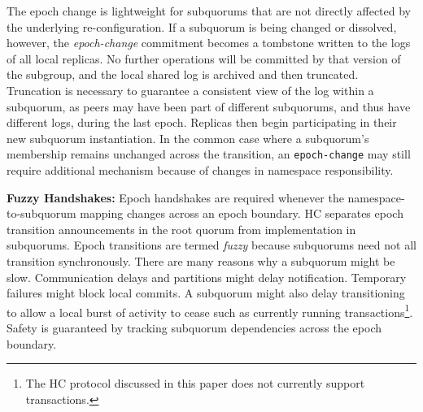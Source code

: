 \documentclass[letterpaper,10pt,twocolumn]{article}
\newcommand{\sub}{subquorum\xspace}
\newcommand{\subs}{subquorums\xspace}
\newcommand{\roo}{root quorum\xspace}
\newcommand{\para}[1]{\vspace{.04in}\noindent\textbf{#1}}
\begin{document}
The epoch change is lightweight for \subs that are not directly affected by
the underlying re-configuration.
If a \sub is being changed or dissolved, however, the \emph{epoch-change}
commitment becomes a tombstone written to the logs of all local replicas.
No further operations will be committed by that version of the subgroup, and
the local shared log is archived and then truncated.
Truncation is necessary to guarantee a consistent view of the log within a
\sub, as peers may have been part of different \subs, and thus have different
logs, during the last epoch.
Replicas then begin participating in their new \sub instantiation.
In the common case where a \sub's membership remains unchanged across the
transition, an \texttt{epoch-change} may still require additional mechanism
because of changes in namespace responsibility.

\para{Fuzzy Handshakes: }
Epoch handshakes are required whenever the namespace-to-\sub mapping changes across an
epoch boundary.
HC separates epoch transition announcements in the
\roo from implementation in \subs.
Epoch transitions are termed \emph{fuzzy} because
\subs need not all transition synchronously.
There are many reasons why a \sub might be slow.
Communication delays and partitions might delay notification.
Temporary failures might block local commits.
A \sub might also delay transitioning to allow a local burst of activity to
cease such as currently running transactions\footnote{The HC protocol
discussed in this paper does not currently support transactions.}.
Safety is guaranteed by tracking \sub dependencies across the epoch boundary.
\end{document}
